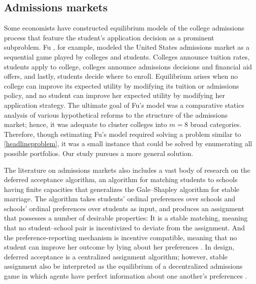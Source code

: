 \subsection{Admissions markets}


Some economists have constructed equilibrium models of the college admissions process that feature the student's application decision as a prominent subproblem. Fu \cite{fu2014}, for example, modeled the United States admissions market as a sequential game played by colleges and students. Colleges announce tuition rates, students apply to college, colleges announce admissions decisions and financial aid offers, and lastly, students decide where to enroll. Equilibrium arises when no college can improve its expected utility by modifying its tuition or admissions policy, and no student can improve her expected utility by modifying her application strategy. The ultimate goal of Fu's model was a comparative statics analysis of various hypothetical reforms to the structure of the admissions market; hence, it was adequate to cluster colleges into $m=8$ broad categories. Therefore, though estimating Fu's model required solving a problem similar to \eqref{headlineproblem}, it was a small instance that could be solved by enumerating all possible portfolios. Our study pursues a more general solution.

The literature on admissions markets also includes a vast body of research on the deferred acceptance algorithm, an algorithm for matching students to schools having finite capacities that generalizes the Gale--Shapley algorithm for stable marriage. The algorithm takes students' ordinal preferences over schools and schools' ordinal preferences over students as input, and produces an assignment that possesses a number of desirable properties: It is a stable matching, meaning that no student--school pair is incentivized to deviate from the assignment. And the preference-reporting mechanism is incentive compatible, meaning that no student can improve her outcome by lying about her preferences \cite{galeandshapley1962,roth1982}. In design, deferred acceptance is a centralized assignment algorithm; however, stable assignment also be interpreted as the equilibrium of a decentralized admissions game in which agents have perfect information about one another's preferences \cite{azevedoandleshno2016}.

